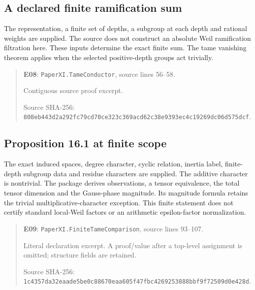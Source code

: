 \documentclass[10pt,oneside]{book}
\begin{document}
\subsection{A declared finite ramification sum}
\label{guide:E08}
The representation, a finite set of depths, a subgroup at each depth and rational weights are supplied. The source does not construct an absolute Weil ramification filtration here.
These inputs determine the exact finite sum. The tame vanishing theorem applies when the selected positive-depth groups act trivially.

\begin{quote}\footnotesize\textbf{E08}: \nolinkurl{PaperXI.TameConductor}, source lines 56--58.\par Contiguous source proof excerpt.\par Source SHA-256: {\scriptsize\texttt{808eb443d2a292fc79cd70ce323c369acd62c38e9393ec4c19269dc06d575dcf}}.\end{quote}


\subsection{Proposition 16.1 at finite scope}
\label{guide:E09}
The exact induced spaces, degree character, cyclic relation, inertia label, finite-depth subgroup data and residue characters are supplied. The additive character is nontrivial.
The package derives observations, a tensor equivalence, the total tensor dimension and the Gauss-phase magnitude. Its magnitude formula retains the trivial multiplicative-character exception. This finite statement does not certify standard local-Weil factors or an arithmetic epsilon-factor normalization.

\begin{quote}\footnotesize\textbf{E09}: \nolinkurl{PaperXI.FiniteTameComparison}, source lines 93--107.\par Literal declaration excerpt. A proof/value after a top-level assignment is omitted; structure fields are retained.\par Source SHA-256: {\scriptsize\texttt{1c4357da32eaade5be0c88670eaa605f47fbc4269253888bbf9f72509d0e428d}}.\end{quote}

\end{document}

